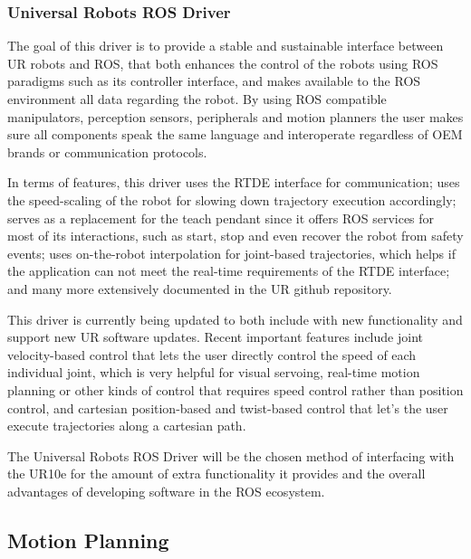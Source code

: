 \subsubsection{Universal Robots ROS Driver}

\par The goal of this driver is to provide a stable and sustainable interface between UR robots and ROS, that both enhances the control of the robots using ROS paradigms such as its controller interface, and makes available to the ROS environment all data regarding the robot. By using ROS compatible manipulators, perception sensors, peripherals and motion planners the user makes sure all components speak the same language and interoperate regardless of OEM brands or communication protocols. 
\par In terms of features, this driver uses the RTDE interface for communication; uses the speed-scaling of the robot for slowing down trajectory execution accordingly; serves as a replacement for the teach pendant since it offers ROS services for most of its interactions, such as start, stop and even recover the robot from safety events; uses on-the-robot interpolation for joint-based trajectories, which helps if the application can not meet the real-time requirements of the RTDE interface; and many more extensively documented in the UR github repository.
\par This driver is currently being updated to both include with new functionality and support new UR software updates. Recent important features include joint velocity-based control that lets the user directly control the speed of each individual joint, which is very helpful for visual servoing, real-time motion planning or other kinds of control that requires speed control rather than position control, and cartesian position-based and twist-based control that let's the user execute trajectories along a cartesian path.
\par The Universal Robots ROS Driver will be the chosen method of interfacing with the UR10e for the amount of extra functionality it provides and the overall advantages of developing software in the ROS ecosystem.



\subsection{Motion Planning}

